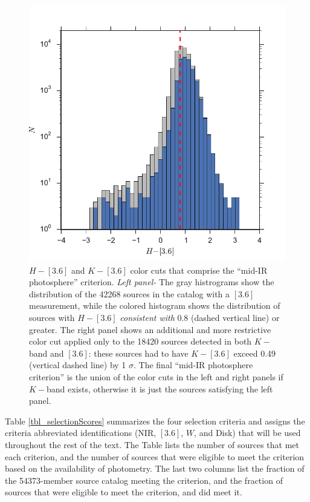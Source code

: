 \begin{figure}[ht!]
  \caption{$H-[3.6]$ and $K-[3.6]$ color cuts that comprise the ``mid-IR photosphere'' criterion.  \emph{Left panel-} The gray histrograms show the distribution of the 42268 sources in the catalog with a $[3.6]$ measurement, while the colored histogram shows the distribution of sources with $H-[3.6]$ \emph{consistent with} 0.8 (dashed vertical line) or greater.  The right panel shows an additional and more restrictive color cut applied only to the 18420 sources detected in both $K-$ band and $[3.6]$: these sources had to have $K-[3.6]$ exceed 0.49 (vertical dashed line) by 1 $\sigma$.  The final ``mid-IR photosphere criterion'' is the union of the color cuts in the left and right panels if $K-$band exists, otherwise it is just the sources satisfying the left panel.  \label{fig_midIR_phot_sel}}
\centering
\includegraphics[scale=0.6]{chIMACS/figures/midIR_phot_sel}
\end{figure}

Table \ref{tbl_selectionScores} summarizes the four selection criteria and assigns the criteria abbreviated identifications (NIR, $[3.6]$, $W$, and Disk) that will be used throughout the rest of the text.  The Table lists the number of sources that met each criterion, and the number of sources that were eligible to meet the criterion based on the availability of photometry.  The last two columns list the fraction of the 54373-member source catalog meeting the criterion, and the fraction of sources that were eligible to meet the criterion, and did meet it.


